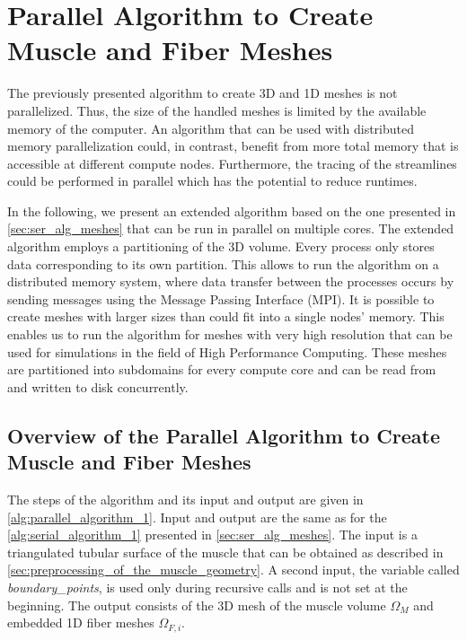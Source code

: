 
\setcounter{section}{4}
\section{Parallel Algorithm to Create Muscle and Fiber Meshes}\label{sec:parallel_algorithm}


The previously presented algorithm to create 3D and 1D meshes is not parallelized. 
Thus, the size of the handled meshes is limited by the available memory of the computer.
An algorithm that can be used with distributed memory parallelization could, in contrast, benefit from more total memory that is accessible at different compute nodes. Furthermore, the tracing of the streamlines could be performed in parallel which has the potential to reduce runtimes.

In the following, we present an extended algorithm based on the one presented in \cref{sec:ser_alg_meshes} that can be run in parallel on multiple cores. The extended algorithm employs a partitioning of the 3D volume. Every process only stores data corresponding to its own partition. This allows to run the algorithm on a distributed memory system, where data transfer between the processes occurs by sending messages using the Message Passing Interface (MPI). It is possible to create meshes with larger sizes than could fit into a single nodes' memory. This enables us to run the algorithm for meshes with very high resolution that can be used for simulations in the field of High Performance Computing. 
These meshes are partitioned into subdomains for every compute core and can be read from and written to disk concurrently.

\subsection{Overview of the Parallel Algorithm to Create Muscle and Fiber Meshes}

The steps of the algorithm and its input and output are given in \cref{alg:parallel_algorithm_1}. Input and output are the same as for the \cref{alg:serial_algorithm_1} presented in \cref{sec:ser_alg_meshes}. The input is a triangulated tubular surface of the muscle that can be obtained as described in \cref{sec:preprocessing_of_the_muscle_geometry}. A second input, the variable called \emph{boundary\_points}, is used only during recursive calls and is not set at the beginning. The output consists of the 3D mesh of the muscle volume $\Omega_M$ and embedded 1D fiber meshes $\Omega_{F,i}$. 

